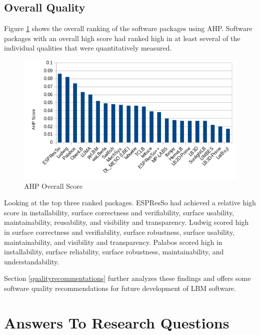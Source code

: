 \documentclass[12pt, notitlepage]{article}
\begin{document}
\subsection{Overall Quality}

Figure \ref{Fig_OverallScore} shows the overall ranking of the software packages using AHP. Software packages with an overall high score had ranked high in at least several of the individual qualities that were quantitatively measured.

\begin{figure}[h!]
	\begin{center}
		\includegraphics[width=1.0\textwidth]{finalscore_chart}
		\caption{AHP Overall Score}
		\label{Fig_OverallScore}
	\end{center}
\end{figure}

Looking at the top three ranked packages. ESPResSo had achieved a relative high score in installability, surface correctness and verifiability, surface usability, maintainability, reusability, and visibility and transparency. Ludwig scored high in surface correctness and verifiability, surface robustness, surface usability, maintainability, and visibility and transparency. Palabos scored high in installability, surface reliability, surface robustness, maintainability, and understandability. 

Section \ref{qualityrecommentations} further analyzes these findings and offers some software quality recommendations for future development of LBM software.

\newpage

\section{Answers To Research Questions}\label{answersquestions}
\end{document}
